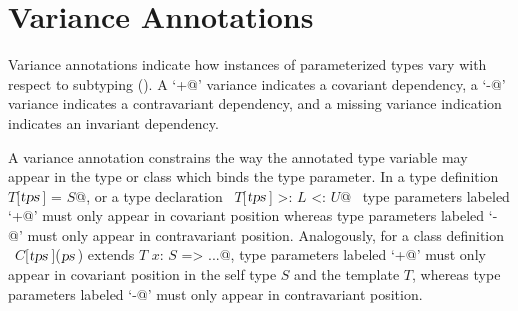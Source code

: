 \section{Variance Annotations}\label{sec:variances}

Variance annotations indicate how instances of parameterized types
vary with respect to subtyping ().  A
`\lstinline@+@' variance indicates a covariant dependency, a
`\lstinline@-@' variance indicates a contravariant dependency, and a
missing variance indication indicates an invariant dependency.

A variance annotation constrains the way the annotated type variable
may appear in the type or class which binds the type parameter.  In a
type definition ~\lstinline@type $T$[$\mbox{\sl tps}\,$] = $S$@, or a type 
declaration ~\lstinline@type $T$[$\mbox{\sl tps}\,$] >: $L$ <: $U$@~ type parameters labeled
`\lstinline@+@' must only appear in covariant position whereas
type parameters labeled `\lstinline@-@' must only appear in contravariant
position. Analogously, for a class definition
~\lstinline@class $C$[$\mbox{\sl tps}\,$]($\mbox{\sl ps}\,$) extends $T$ { $x$: $S$ => ...}@, 
type parameters labeled
`\lstinline@+@' must only appear in covariant position in the
self type $S$ and the template $T$, whereas type
parameters labeled `\lstinline@-@' must only appear in contravariant
position. 

